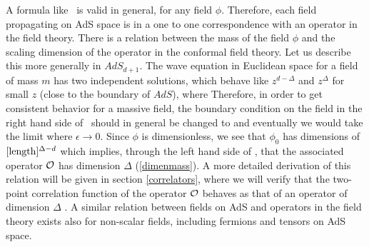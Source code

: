 A  formula like \genera\ is valid in general, for any field $\phi$. 
Therefore, each field propagating on AdS space 
is in a one to one correspondence with 
an operator in the field theory.
There is a relation between the mass  of the field $\phi$ and 
the scaling dimension of the operator in the conformal field theory. 
Let us describe this more generally in $AdS_{d+1}$.
The wave 
equation in Euclidean space for  a field of mass $m$ has 
two independent solutions, 
which behave like $z^{d - \Delta } $ and $z^{\Delta}$
for small $z$ (close to the boundary of $AdS$),
where 
Therefore, in order to get consistent behavior for a massive field, 
the boundary condition on the
field in the right hand side of \genera\ should in general be changed to
and eventually we would take the limit where $\epsilon \to 0$. 
Since $\phi$ is dimensionless, we see that $\phi_0$ has dimensions
of $[{\rm length}]^{\Delta - d}$ which implies, through the 
left hand side of \genera, that the associated operator ${\cal  O}$
has dimension $\Delta$ (\ref{dimenmass}). A more detailed derivation of 
this relation will be given in section \ref{correlators},
where we will verify that the two-point correlation function
of the operator ${\cal O}$ behaves as that of an operator of dimension
$\Delta$ \cite{Gubser:1998bc,Witten:1998qj}. 
A similar relation between fields on AdS and operators in the field
theory exists also for non-scalar fields, including fermions and tensors
on AdS space.




